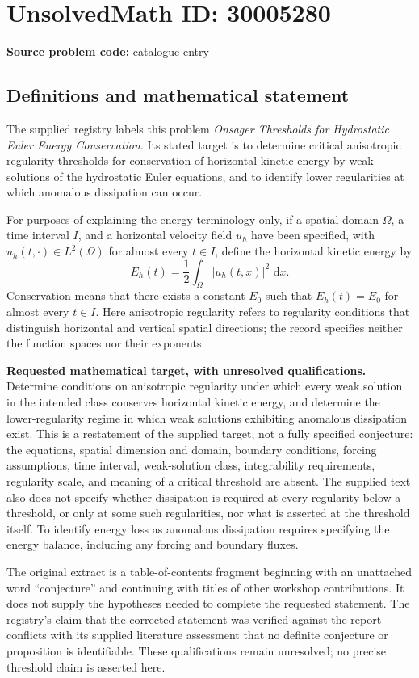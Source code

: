 \documentclass[11pt]{article}
\newcommand{\dd}{\,\mathrm{d}}
\begin{document}
\section*{UnsolvedMath ID: 30005280}
\textbf{Source problem code:} catalogue entry
\subsection{Definitions and mathematical statement}
The supplied registry labels this problem \emph{Onsager Thresholds for Hydrostatic Euler Energy Conservation}. Its stated target is to determine critical anisotropic regularity thresholds for conservation of horizontal kinetic energy by weak solutions of the hydrostatic Euler equations, and to identify lower regularities at which anomalous dissipation can occur.

For purposes of explaining the energy terminology only, if a spatial domain \(\Omega\), a time interval \(I\), and a horizontal velocity field \(u_h\) have been specified, with \(u_h(t,\cdot)\in L^2(\Omega)\) for almost every \(t\in I\), define the horizontal kinetic energy by
\[
E_h(t)=\frac12\int_{\Omega}|u_h(t,x)|^2\,\dd x.
\]
Conservation means that there exists a constant \(E_0\) such that \(E_h(t)=E_0\) for almost every \(t\in I\). Here anisotropic regularity refers to regularity conditions that distinguish horizontal and vertical spatial directions; the record specifies neither the function spaces nor their exponents.

\textbf{Requested mathematical target, with unresolved qualifications.} Determine conditions on anisotropic regularity under which every weak solution in the intended class conserves horizontal kinetic energy, and determine the lower-regularity regime in which weak solutions exhibiting anomalous dissipation exist. This is a restatement of the supplied target, not a fully specified conjecture: the equations, spatial dimension and domain, boundary conditions, forcing assumptions, time interval, weak-solution class, integrability requirements, regularity scale, and meaning of a critical threshold are absent. The supplied text also does not specify whether dissipation is required at every regularity below a threshold, or only at some such regularities, nor what is asserted at the threshold itself. To identify energy loss as anomalous dissipation requires specifying the energy balance, including any forcing and boundary fluxes.

The original extract is a table-of-contents fragment beginning with an unattached word ``conjecture'' and continuing with titles of other workshop contributions. It does not supply the hypotheses needed to complete the requested statement. The registry's claim that the corrected statement was verified against the report conflicts with its supplied literature assessment that no definite conjecture or proposition is identifiable. These qualifications remain unresolved; no precise threshold claim is asserted here.
\end{document}
